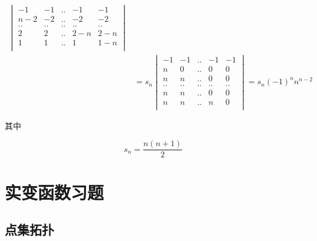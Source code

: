 \documentclass[12pt,a4paper]{ctexart}
\begin{document}
\begin{align*}
\begin{vmatrix}
          -1 & -1 & .. & -1 & -1  \\
          n-2 & -2 & ..  & -2 & -2  \\
          .. & .. & .. & .. & .. \\
          2 & 2 & .. & 2-n & 2-n \\
          1 & 1 & .. & 1 & 1-n  \\
    \end{vmatrix} \\
    &= s_n \begin{vmatrix}
          -1 & -1 & .. & -1 & -1  \\
          n & 0 & ..  & 0 & 0  \\
          n & n & ..  & 0 & 0  \\
          .. & .. & .. & .. & .. \\
          n & n & .. & 0 & 0 \\
          n & n & .. & n & 0  \\
    \end{vmatrix} = s_n(-1)^n n^{n-2}
\end{align*}

其中 

\[
s_n = \frac{n(n+1)}{2}
\]

\section{实变函数习题}

\subsection{点集拓扑}
\end{document}
